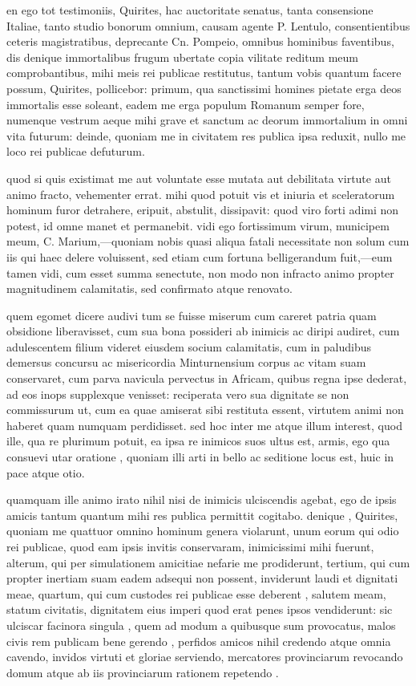  en ego tot testimoniis, Quirites, hac auctoritate senatus, tanta consensione Italiae, tanto studio bonorum omnium, causam agente P. Lentulo, consentientibus ceteris magistratibus, deprecante Cn. Pompeio, omnibus hominibus faventibus, dis denique immortalibus frugum ubertate copia vilitate reditum meum comprobantibus, mihi meis rei publicae restitutus, tantum vobis quantum facere possum, Quirites, pollicebor: primum, qua sanctissimi homines pietate erga deos immortalis esse soleant, eadem me erga populum Romanum semper fore, numenque vestrum aeque mihi grave et sanctum ac deorum immortalium in omni vita futurum: deinde, quoniam me in civitatem res publica ipsa reduxit, nullo me loco rei publicae defuturum.

 quod si quis existimat me aut voluntate esse mutata aut debilitata virtute aut animo fracto, vehementer errat. mihi quod potuit vis et iniuria et sceleratorum hominum furor detrahere, eripuit, abstulit, dissipavit: quod viro forti adimi non potest, id omne manet et permanebit. vidi ego fortissimum virum, municipem meum, C. Marium,—quoniam nobis quasi aliqua fatali necessitate non solum cum iis qui haec delere voluissent, sed etiam cum fortuna belligerandum fuit,—eum tamen vidi, cum esset summa senectute, non modo non infracto animo propter magnitudinem calamitatis, sed confirmato atque renovato.

 quem egomet dicere audivi tum se fuisse miserum cum careret patria quam obsidione liberavisset, cum sua bona possideri ab inimicis ac diripi audiret, cum adulescentem filium videret eiusdem socium calamitatis, cum in paludibus demersus concursu ac misericordia Minturnensium corpus ac vitam suam conservaret, cum parva navicula pervectus in Africam, quibus regna ipse dederat, ad eos inops supplexque venisset: reciperata vero sua dignitate se non commissurum ut, cum ea quae amiserat sibi restituta essent, virtutem animi non haberet quam numquam perdidisset. sed hoc inter me atque illum interest, quod ille, qua re plurimum potuit, ea ipsa re inimicos suos ultus est, armis, ego qua consuevi utar oratione , quoniam illi arti in bello ac seditione locus est, huic in pace atque otio.

 quamquam ille animo irato nihil nisi de inimicis ulciscendis agebat, ego de ipsis amicis tantum quantum mihi res publica permittit cogitabo. denique , Quirites, quoniam me quattuor omnino hominum genera violarunt, unum eorum qui odio rei publicae, quod eam ipsis invitis conservaram, inimicissimi mihi fuerunt, alterum, qui per simulationem amicitiae nefarie me prodiderunt, tertium, qui cum propter inertiam suam eadem adsequi non possent, inviderunt laudi et dignitati meae, quartum, qui cum custodes rei publicae esse deberent , salutem meam, statum civitatis, dignitatem eius imperi quod erat penes ipsos vendiderunt: sic ulciscar facinora singula , quem ad modum a quibusque sum provocatus, malos civis rem publicam bene gerendo , perfidos amicos nihil credendo atque omnia cavendo, invidos virtuti et gloriae serviendo, mercatores provinciarum revocando domum atque ab iis provinciarum rationem repetendo .

